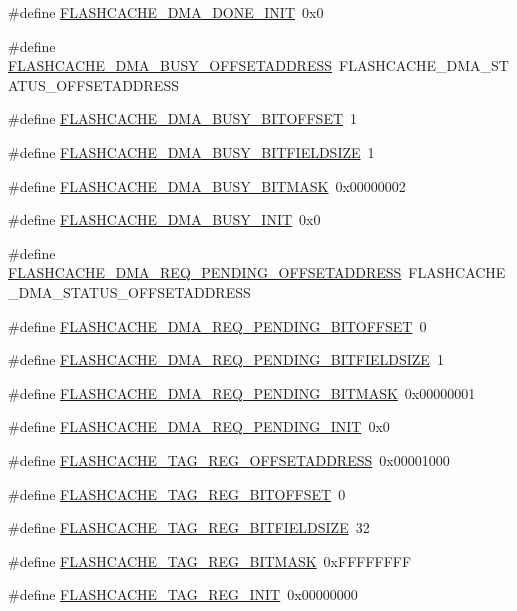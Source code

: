 \begin{DoxyCompactItemize}
\item 
\#define \hyperlink{a00550_abc051a943b553660dec3135bae27e96b}{FLASHCACHE\_\-DMA\_\-DONE\_\-INIT}~0x0
\item 
\#define \hyperlink{a00550_ade568016ca9235ff3e832ef474282eac}{FLASHCACHE\_\-DMA\_\-BUSY\_\-OFFSETADDRESS}~FLASHCACHE\_\-DMA\_\-STATUS\_\-OFFSETADDRESS
\item 
\#define \hyperlink{a00550_a6475b1426c7cf72ae3fb439d1ac6a0c8}{FLASHCACHE\_\-DMA\_\-BUSY\_\-BITOFFSET}~1
\item 
\#define \hyperlink{a00550_a00721a20c8def748ebd733d549586ed2}{FLASHCACHE\_\-DMA\_\-BUSY\_\-BITFIELDSIZE}~1
\item 
\#define \hyperlink{a00550_a1e9a5d070a023bdc47097388365427f8}{FLASHCACHE\_\-DMA\_\-BUSY\_\-BITMASK}~0x00000002
\item 
\#define \hyperlink{a00550_a61af7848d939311edbe1ab2a7a6eb88f}{FLASHCACHE\_\-DMA\_\-BUSY\_\-INIT}~0x0
\item 
\#define \hyperlink{a00550_a606778a2b3e30ed76758246ff0bc96ac}{FLASHCACHE\_\-DMA\_\-REQ\_\-PENDING\_\-OFFSETADDRESS}~FLASHCACHE\_\-DMA\_\-STATUS\_\-OFFSETADDRESS
\item 
\#define \hyperlink{a00550_abe41e081b80adb25c44bdf1cf1f5ba92}{FLASHCACHE\_\-DMA\_\-REQ\_\-PENDING\_\-BITOFFSET}~0
\item 
\#define \hyperlink{a00550_a183f6773ddd19186eb70f767b2af0973}{FLASHCACHE\_\-DMA\_\-REQ\_\-PENDING\_\-BITFIELDSIZE}~1
\item 
\#define \hyperlink{a00550_a086b98563b59476dc905c6cf0eed8404}{FLASHCACHE\_\-DMA\_\-REQ\_\-PENDING\_\-BITMASK}~0x00000001
\item 
\#define \hyperlink{a00550_acfcc196888d555f3e18fc3047c3ec811}{FLASHCACHE\_\-DMA\_\-REQ\_\-PENDING\_\-INIT}~0x0
\item 
\#define \hyperlink{a00550_acb94d3cf4c5e00c917649222dcebe4d8}{FLASHCACHE\_\-TAG\_\-REG\_\-OFFSETADDRESS}~0x00001000
\item 
\#define \hyperlink{a00550_a7c6aab5510e7d1700ba6ee5234357a00}{FLASHCACHE\_\-TAG\_\-REG\_\-BITOFFSET}~0
\item 
\#define \hyperlink{a00550_a8919da057499cefa70ba3c48bfb4b1ed}{FLASHCACHE\_\-TAG\_\-REG\_\-BITFIELDSIZE}~32
\item 
\#define \hyperlink{a00550_af9794af49fe523bc7a8a1c7a4ac29f08}{FLASHCACHE\_\-TAG\_\-REG\_\-BITMASK}~0xFFFFFFFF
\item 
\#define \hyperlink{a00550_ab120e502eae422663a164879eed55dea}{FLASHCACHE\_\-TAG\_\-REG\_\-INIT}~0x00000000
\item 

\end{DoxyCompactItemize}
